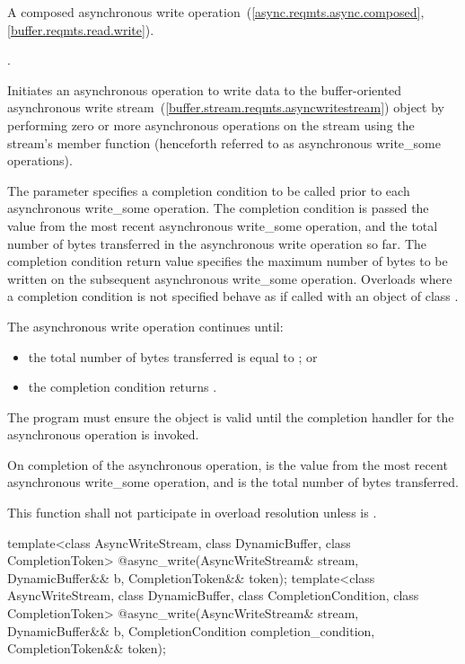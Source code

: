 \begin{itemdescr}
\pnum
A composed asynchronous write operation~(\ref{async.reqmts.async.composed}, \ref{buffer.reqmts.read.write}).

\pnum
\completionsig {}.

\pnum
\effects Initiates an asynchronous operation to write data to the buffer-oriented asynchronous write stream~(\ref{buffer.stream.reqmts.asyncwritestream}) object  by performing zero or more asynchronous operations on the stream using the stream's  member function (henceforth referred to as asynchronous write_some operations).

\pnum
The  parameter specifies a completion condition to be called prior to each asynchronous write_some operation. The completion condition is passed the  value from the most recent asynchronous write_some operation, and the total number of bytes transferred in the asynchronous write operation so far. The completion condition return value specifies the maximum number of bytes to be written on the subsequent asynchronous write_some operation. Overloads where a completion condition is not specified behave as if called with an object of class .

\pnum
The asynchronous write operation continues until:

\begin{itemize}
\item
the total number of bytes transferred is equal to ; or
\item
the completion condition returns .
\end{itemize}

\pnum
The program must ensure the  object  is valid until the completion handler for the asynchronous operation is invoked.

\pnum
On completion of the asynchronous operation,  is the  value from the most recent asynchronous write_some operation, and  is the total number of bytes transferred.

\pnum
\remarks This function shall not participate in overload resolution unless  is .
\end{itemdescr}

%
\begin{itemdecl}
template<class AsyncWriteStream, class DynamicBuffer, class CompletionToken>
  @\DEDUCED@ async_write(AsyncWriteStream& stream,
                      DynamicBuffer&& b, CompletionToken&& token);
template<class AsyncWriteStream, class DynamicBuffer, class CompletionCondition,
         class CompletionToken>
    @\DEDUCED@ async_write(AsyncWriteStream& stream,
                        DynamicBuffer&& b,
                        CompletionCondition completion_condition,
                        CompletionToken&& token);
\end{itemdecl}

